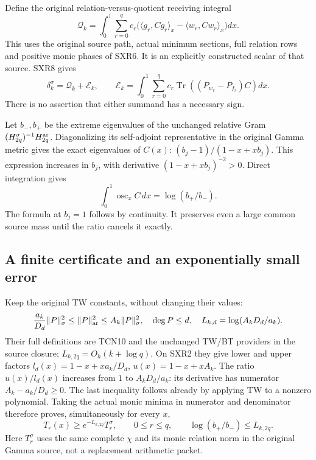 Define the original relation-versus-quotient receiving integral
\begin{equation}\tag{SXR11}
 \mathcal Q_k=\int_0^1\sum_{r=0}^q c_r
  \bigl(\langle g_r,Cg_r\rangle_x
                  -\langle w_r,Cw_r\rangle_x\bigr)dx.
\end{equation}
This uses the original source path, actual minimum sections, full
relation rows and positive monic phases of SXR6. It is an explicitly
constructed scalar of that source. SXR8 gives
\begin{equation}\tag{SXR12}
 \delta_k^\sigma=\mathcal Q_k+\mathcal E_k,\qquad
 \mathcal E_k=\int_0^1\sum_{r=0}^q c_r
          \operatorname{Tr}((P_{w_r}-P_{f_r})C)dx.
\end{equation}
There is no assertion that either summand has a necessary sign.

Let $b_-,b_+$ be the extreme eigenvalues of the unchanged relative
Gram $(H_{2q}^\sigma)^{-1}H_{2q}^{\rm ar}$. Diagonalizing its
self-adjoint representative in the original Gamma metric gives
the exact eigenvalues of $C(x)$:
$(b_j-1)/(1-x+xb_j)$. This expression increases in $b_j$,
with derivative $(1-x+xb_j)^{-2}>0$. Direct integration gives
\begin{equation}\tag{SXR13}
 \int_0^1\operatorname{osc}_x C\,dx
       =\log(b_+/b_-).
\end{equation}
The formula at $b_j=1$ follows by continuity. It preserves even a
large common source mass until the ratio cancels it exactly.

\subsection{A finite certificate and an exponentially small error}

Keep the original TW constants, without changing their values:
\[
 \frac{a_k}{D_d}\|P\|_\sigma^2\le\|P\|_{\rm ar}^2
                      \le A_k\|P\|_\sigma^2,
 \quad \deg P\le d,\quad
 L_{k,d}=\log(A_kD_d/a_k).
\]
Their full definitions are TCN10 and the unchanged TW/BT providers
in the source closure; $L_{k,2q}=O_h(k+\log q)$. On SXR2 they
give lower and upper factors
$l_d(x)=1-x+x a_k/D_d$, $u(x)=1-x+xA_k$.
The ratio $u(x)/l_d(x)$ increases from $1$ to
$A_kD_d/a_k$: its derivative has numerator $A_k-a_k/D_d\ge0$.
The last inequality follows already by applying TW to a nonzero
polynomial. Taking the actual monic minima in numerator and
denominator therefore proves, simultaneously for every $x$,
\begin{equation}\tag{SXR14}
 T_r(x)\ge e^{-L_{k,2q}}T_r^\sigma,
 \qquad 0\le r\le q,\qquad
 \log(b_+/b_-)\le L_{k,2q}.
\end{equation}
Here $T_r^\sigma$ uses the same complete $\chi$ and its monic
relation norm in the original Gamma source, not a replacement
arithmetic packet.

